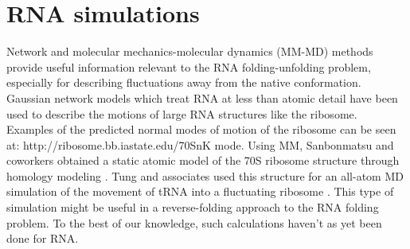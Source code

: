 \section{RNA simulations}
Network  and molecular  mechanics-molecular  dynamics (MM-MD)  methods
provide  useful  information  relevant  to the  RNA  folding-unfolding
problem, especially  for describing fluctuations away  from the native
conformation.  Gaussian  network  models \cite{y_wang2004,  bahar1998,
  wang2005} which treat RNA at  less than atomic detail have been used
to describe  the motions  of large RNA  structures like  the ribosome.
Examples of the  predicted normal modes of motion  of the ribosome can
be  seen  at:  http://ribosome.bb.iastate.edu/70SnK  mode.  Using  MM,
Sanbonmatsu and  coworkers obtained a  static atomic model of  the 70S
ribosome structure through homology modeling \cite{tung2004}. Tung and
associates used  this structure for  an all-atom MD simulation  of the
movement of  tRNA into a  fluctuating ribosome \cite{sanbonmatsu2005}.
This type of simulation might  be useful in a reverse-folding approach
to  the  RNA folding  problem.  To the  best  of  our knowledge,  such
calculations haven't as yet been done for RNA.

